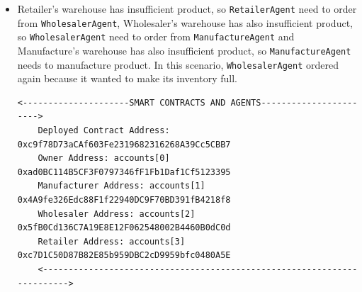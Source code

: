 \begin{itemize}
    \vspace{.5cm}

    \item Retailer's warehouse has insufficient product, so \texttt{RetailerAgent} need to order from \texttt{WholesalerAgent}, Wholesaler's warehouse has also insufficient product, so \texttt{WholesalerAgent} need to order from \texttt{ManufactureAgent} and Manufacture's warehouse has also insufficient product, so \texttt{ManufactureAgent} needs to manufacture product. In this scenario, \texttt{WholesalerAgent} ordered again because it wanted to make its inventory full. 

    \vspace{.5cm}
    \begin{lstlisting}[numbers=none, basicstyle=\ttfamily\tiny]
    <---------------------SMART CONTRACTS AND AGENTS----------------------->
    Deployed Contract Address: 0xc9f78D73aCAf603Fe2319682316268A39Cc5CBB7
    Owner Address: accounts[0] 0xad0BC114B5CF3F0797346fF1Fb1Daf1Cf5123395
    Manufacturer Address: accounts[1] 0x4A9fe326Edc88F1f22940DC9F70BD391fB4218f8
    Wholesaler Address: accounts[2] 0x5fB0Cd136C7A19E8E12F062548002B4460B0dC0d
    Retailer Address: accounts[3] 0xc7D1C50D87B82E85b959DBC2cD9959bfc0480A5E
    <------------------------------------------------------------------------>
    

\end{lstlisting}
\end{itemize}
